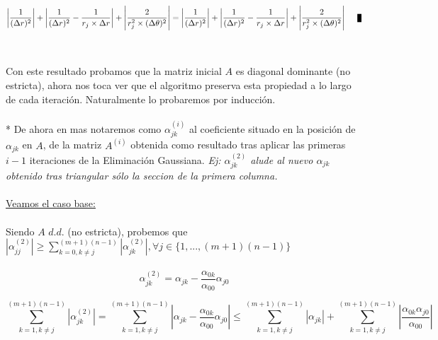 \begin{equation}
 \left | \frac{1}{(\Delta r)^2} \right | + \left | \frac{1}{(\Delta r)^2} - \frac{1}{r_j \times \Delta r} \right | + \left | \frac{2}{r_j^2 \times (\Delta \theta)^2} \right | = \left | \frac{1}{(\Delta r)^2} \right | + \left | \frac{1}{(\Delta r)^2} - \frac{1}{r_j \times \Delta r} \right | +  \left | \frac{2}{r_j^2 \times (\Delta \theta)^2} \right | \qed
\end{equation}
\\
\\
Con este resultado probamos que la matriz inicial $A$ es diagonal dominante (no estricta), ahora nos toca ver que el algoritmo preserva esta propiedad a lo largo de cada iteraci\'on. Naturalmente lo probaremos por inducci\'on.
\\
\\
* De ahora en mas notaremos como $\alpha_{jk}^{(i)}$ al coeficiente situado en la posición de $\alpha_{jk}$ en  $A$, de la matriz $A^{(i)}$ obtenida como resultado tras aplicar las primeras $i-1$ iteraciones de la Eliminaci\'on Gaussiana. \textit{Ej: $\alpha_{jk}^{(2)}$ alude al nuevo $\alpha_{jk}$ obtenido tras triangular s\'olo la seccion de la primera columna.}
\\  
\\
\underline{Veamos el caso base:}
\\
\\
Siendo $A$ $d.d.$ (no estricta), probemos que $\left | \alpha_{jj}^{(2)} \right | \geq \sum_{k=0,k \neq j}^{(m+1)(n-1)} \left | \alpha_{jk}^{(2)} \right |, \forall j \in \{1,...,(m+1)(n-1)\}$
\\
\\
\begin{equation}
\alpha_{jk}^{(2)} =  \alpha_{jk} - \frac{\alpha_{0k}}{\alpha_{00}}\alpha_{j0}
\end{equation}

\begin{equation}
\sum_{k=1,k \neq j}^{(m+1)(n-1)} \left | \alpha_{jk}^{(2)} \right | = \sum_{k=1,k \neq j}^{(m+1)(n-1)} \left | \alpha_{jk} - \frac{\alpha_{0k}}{\alpha_{00}}\alpha_{j0} \right | \leq \sum_{k=1,k \neq j}^{(m+1)(n-1)} \left | \alpha_{jk} \right | + \sum_{k=1,k \neq j}^{(m+1)(n-1)} \left | \frac{\alpha_{0k}\alpha_{j0}}{\alpha_{00}} \right | 
\end{equation}


